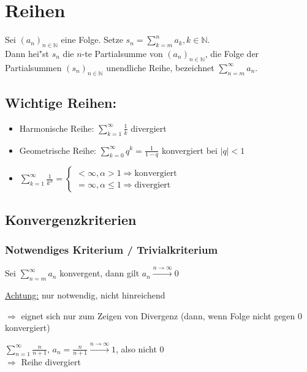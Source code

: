 \documentclass[a4paper,12pt]{article}
\begin{document}
	\section{Reihen}
	\begin{defi}
		Sei $\left(a_n\right)_{n \in \mathbb{N}}$ eine Folge. Setze $s_n = \sum_{k = m}^{n} a_k, k \in \mathbb{N}$.\\
		Dann hei"st $s_n$ die $n$-te Partialsumme von $\left(a_n\right)_{n \in \mathbb{N}}$, die Folge der Partialsummen $\left(s_n\right)_{n \in \mathbb{N}}$ unendliche Reihe, bezeichnet $\sum_{n = m}^{\infty} a_n$.
	\end{defi}
	
	\subsection{Wichtige Reihen:}
	\begin{itemize}
		\item Harmonische Reihe: $\sum_{k = 1}^{\infty} \frac{1}{k}$ divergiert
		\item Geometrische Reihe: $\sum_{k = 0}^{\infty} q^k = \frac{1}{1-q}$ konvergiert bei $\left|q\right| < 1$
		\item $\sum_{k=1}^{\infty} \frac{1}{k^\alpha} = \begin{cases}
			< \infty, \alpha > 1 \Rightarrow \text{konvergiert} \\ 
			= \infty, \alpha \leq 1 \Rightarrow \text{divergiert}
		\end{cases}$
	\end{itemize}
	\newpage

	\subsection{Konvergenzkriterien}
	\subsubsection{Notwendiges Kriterium / Trivialkriterium}
	\begin{defi}
		Sei $\sum_{n=m}^{\infty} a_n$ konvergent, dann gilt $a_n \xrightarrow{n \rightarrow \infty} 0$
	\end{defi}
	\underline{Achtung:} nur notwendig, nicht hinreichend
	\begin{center}
		$\Rightarrow$ eignet sich nur zum Zeigen von Divergenz (dann, wenn Folge nicht gegen 0 konvergiert)
	\end{center}
	\begin{bsp}
		\begin{center}
			$\sum_{n = 1}^{\infty} \frac{n}{n+1}$, $a_n = \frac{n}{n+1} \xrightarrow{n \rightarrow \infty} 1$, also nicht 0 \\
			$\Rightarrow$ Reihe divergiert
		\end{center}
	\end{bsp}
\end{document}
